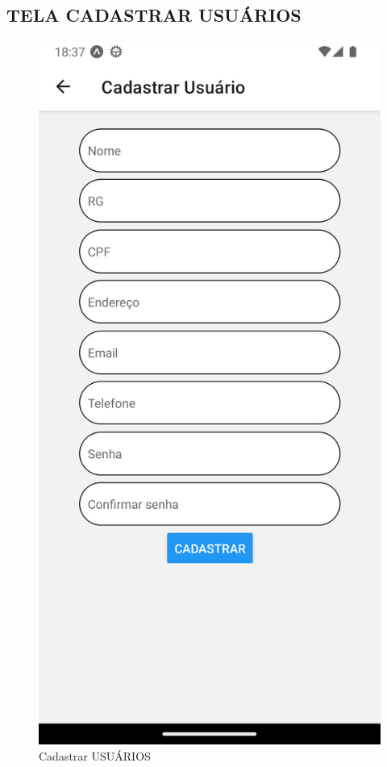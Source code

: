 \newpage

\subsection{TELA CADASTRAR USUÁRIOS}
\begin{figure}[htb]
	\caption{\label{fig_diagrama-classes} Cadastrar USUÁRIOS}
	\begin{center}
	    \includegraphics[width=0.5\linewidth]{imagens/tela-cadastrar-usuario.png}
	\end{center}
\end{figure}

\newpage


